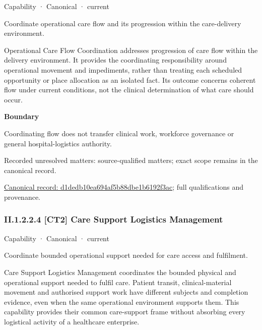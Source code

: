 \label{element:d1dedb10ea694af5b88dbe1b6192f3ac}
{\small Capability · Canonical · current}\par

Coordinate operational care flow and its progression within the care-delivery environment.



Operational Care Flow Coordination addresses progression of care flow within the delivery environment. It provides the coordinating responsibility around operational movement and impediments, rather than treating each scheduled opportunity or place allocation as an isolated fact. Its outcome concerns coherent flow under current conditions, not the clinical determination of what care should occur.



\textbf{Boundary}



Coordinating flow does not transfer clinical work, workforce governance or general hospital-logistics authority.


{\small Recorded unresolved matters: source-qualified matters; exact scope remains in the canonical record.}\par
{\footnotesize \href{../../../../continuum/strategy/capability/d1dedb10ea694af5b88dbe1b6192f3ac.md}{Canonical record: d1dedb10ea694af5b88dbe1b6192f3ac}; full qualifications and provenance.}\par
\subsubsection*{II.1.2.2.4 [CT2] Care Support Logistics Management}
\label{navigation:II.1.2.2.4}

\label{element:92be036674254f719cf4bb613120128a}
{\small Capability · Canonical · current}\par

Coordinate bounded operational support needed for care access and fulfilment.



Care Support Logistics Management coordinates the bounded physical and operational support needed to fulfil care. Patient transit, clinical-material movement and authorised support work have different subjects and completion evidence, even when the same operational environment supports them. This capability provides their common care-support frame without absorbing every logistical activity of a healthcare enterprise.



